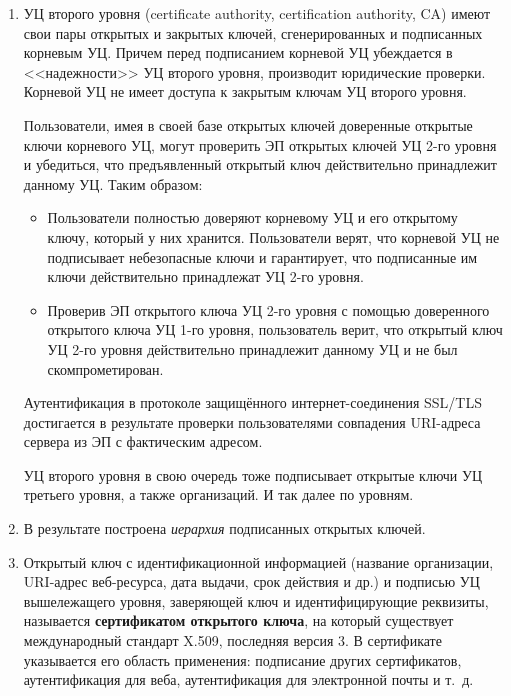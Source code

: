 \begin{enumerate}
    \item УЦ второго уровня (certificate authority, certification authority, CA) имеют свои пары открытых и закрытых ключей, сгенерированных и подписанных корневым УЦ. Причем перед подписанием корневой УЦ убеждается в <<надежности>> УЦ второго уровня, производит юридические проверки. Корневой УЦ не имеет доступа к закрытым ключам УЦ второго уровня.

        Пользователи, имея в своей базе открытых ключей доверенные открытые ключи корневого УЦ, могут проверить ЭП открытых ключей УЦ 2-го уровня и убедиться, что предъявленный открытый ключ действительно принадлежит данному УЦ. Таким образом:
        \begin{itemize}
            \item Пользователи полностью доверяют корневому УЦ и его открытому ключу, который у них хранится. Пользователи верят, что корневой УЦ не подписывает небезопасные ключи и гарантирует, что подписанные им ключи действительно принадлежат УЦ 2-го уровня.
            \item Проверив ЭП открытого ключа УЦ 2-го уровня с помощью доверенного открытого ключа УЦ 1-го уровня, пользователь верит, что открытый ключ УЦ 2-го уровня действительно принадлежит данному УЦ и не был скомпрометирован.
        \end{itemize}

        Аутентификация в протоколе защищённого интернет-соединения SSL/TLS достигается в результате проверки пользователями совпадения URI-адреса сервера из ЭП с фактическим адресом.

        УЦ второго уровня в свою очередь тоже подписывает открытые ключи УЦ третьего уровня, а также организаций. И так далее по уровням.

    \item В результате построена \emph{иерархия} подписанных открытых ключей.

    \item Открытый ключ с идентификационной информацией (название организации, URI-адрес веб-ресурса, дата выдачи, срок действия и др.) и подписью УЦ вышележащего уровня, заверяющей ключ и идентифицирующие реквизиты, называется \textbf{сертификатом открытого ключа}, на который существует международный стандарт X.509, последняя версия 3. В сертификате указывается его область применения: подписание других сертификатов, аутентификация для веба, аутентификация для электронной почты и т.~д.
\end{enumerate}

